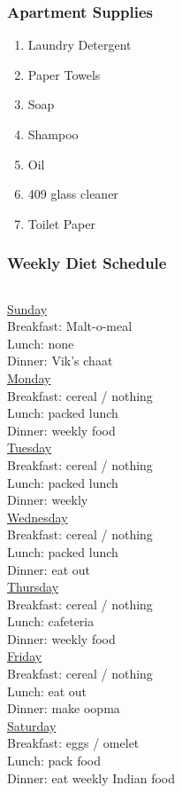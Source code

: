 \begin{frame} 
\frametitle{Apartment Supplies} 
\begin{enumerate}
\item \small Laundry Detergent
\item \small Paper Towels
\item \small Soap
\item \small Shampoo
\item \small Oil
\item \small 409 glass cleaner
\item \small Toilet Paper
\end{enumerate}
\end{frame} 


\begin{frame}
\frametitle{Weekly Diet Schedule}
\begin{columns}
\centering \underline{Sunday} \\ 
Breakfast: Malt-o-meal \\  
Lunch:   none  \\  
Dinner:  Vik's chaat   \\   
\centering \underline{Monday} \\
Breakfast:  cereal / nothing\\  
Lunch:    packed lunch  \\  
Dinner:   weekly food  \\    
\centering \underline{Tuesday} \\ 
Breakfast:  cereal / nothing\\  
Lunch:   packed lunch \\  
Dinner:    weekly  \\   
\centering \underline{Wednesday} \\
Breakfast: cereal / nothing \\  
Lunch:   packed lunch \\  
Dinner: eat out  \\    
\centering \underline{Thursday} \\ 
Breakfast:  cereal / nothing\\  
Lunch:   cafeteria   \\  
Dinner:  weekly food  \\ 
\centering \underline{Friday} \\
Breakfast:  cereal / nothing \\
Lunch:  eat out    \\
Dinner: make oopma  \\
\centering \underline{Saturday} \\
Breakfast:  eggs / omelet\\
Lunch:   pack food  \\
Dinner:  eat weekly Indian food   \\ 
\end{columns}
\end{frame}  


